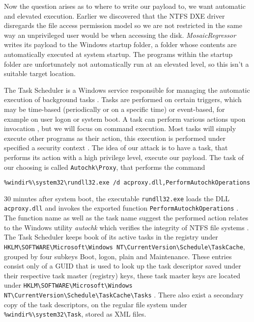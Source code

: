 Now the question arises as to where to write our payload to, we want automatic and elevated execution.
Earlier we discovered that the \ac{NTFS} \ac{DXE} driver disregards the file access permission model  so we are not restricted in the same way an unprivileged user would be when accessing the disk.
\emph{MosaicRegressor} writes its payload to the Windows startup folder, a folder whose contents are automatically executed at system startup.
The programs within the startup folder are unfortunately not automatically run at an elevated level, so this isn't a suitable target location.


The Task Scheduler is a Windows service responsible for managing the automatic execution of background tasks \cite[10. The Task Scheduler]{windows-internals-7-part2}.
Tasks are performed on certain triggers, which may be time-based (periodically or on a specific time) or event-based, for example on user logon or system boot\cite{microsoft-task-scheduler-triggers}.
A task can perform various actions upon invocation \cite{microsoft-task-scheduler-actions}, but we will focus on command execution.
Most tasks will simply execute other programs as their action, this execution is performed under specified a security context \cite{microsoft-task-scheduler-security-contexts}.
The idea of our attack is to have a task, that performs its action with a high privilege level, execute our payload.
The task of our choosing is called \lstinline{Autochk\Proxy}, that performs the command

\begin{lstlisting}
%windir%\system32\rundll32.exe /d acproxy.dll,PerformAutochkOperations
\end{lstlisting}

30 minutes after system boot, the executable \lstinline{rundll32.exe} loads the \ac{DLL} \lstinline{acproxy.dll} and invokes the exported function \lstinline{PerformAutochkOperations} \cite{microsoft-rundll32}.
The function name as well as the task name suggest the performed action relates to the Windows utility \emph{autochk} which verifies the integrity of \ac{NTFS} file systems \cite{microsoft-autochk}.
The Task Scheduler keeps book of its active tasks in the registry under \lstinline{HKLM\SOFTWARE\Microsoft\Windows NT\CurrentVersion\Schedule\TaskCache}, grouped by four subkeys Boot, logon, plain and Maintenance.
These entries consist only of a \ac{GUID} that is used to look up the task descriptor saved under their respective task master (registry) keys, these task master keys are located under \lstinline{HKLM\SOFTWARE\Microsoft\Windows NT\CurrentVersion\Schedule\TaskCache\Tasks} \cite[10. The Task Scheduler - Initialization]{windows-internals-7-part2}.
There also exist a secondary copy of the task descriptors, on the regular file system under \lstinline{%windir%\system32\Task}, stored as \ac{XML} files.

